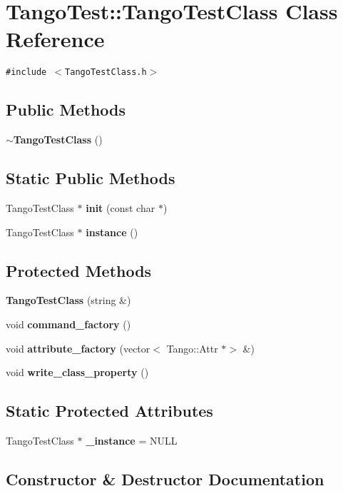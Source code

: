 \section{Tango\-Test::Tango\-Test\-Class  Class Reference}
\label{classTangoTest_1_1TangoTestClass}
{\tt \#include $<$Tango\-Test\-Class.h$>$}

\subsection*{Public Methods}
\begin{CompactItemize}
\item 
{\bf $\sim$Tango\-Test\-Class} ()
\end{CompactItemize}
\subsection*{Static Public Methods}
\begin{CompactItemize}
\item 
Tango\-Test\-Class $\ast$ {\bf init} (const char $\ast$)
\item 
Tango\-Test\-Class $\ast$ {\bf instance} ()
\end{CompactItemize}
\subsection*{Protected Methods}
\begin{CompactItemize}
\item 
{\bf Tango\-Test\-Class} (string \&)
\item 
void {\bf command\_\-factory} ()
\item 
void {\bf attribute\_\-factory} (vector$<$ Tango::Attr $\ast$$>$ \&)
\item 
void {\bf write\_\-class\_\-property} ()
\end{CompactItemize}
\subsection*{Static Protected Attributes}
\begin{CompactItemize}
\item 
Tango\-Test\-Class $\ast$ {\bf \_\-instance} = NULL
\end{CompactItemize}


\subsection{Constructor \& Destructor Documentation}
